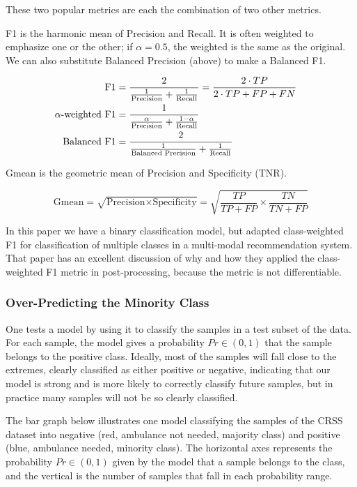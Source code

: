 These two popular metrics are each the combination of two other metrics.  

F1 is the harmonic mean of Precision and Recall.  It is often weighted to emphasize one or the other; if $\alpha = 0.5$, the weighted is the same as the original.  We can also substitute Balanced Precision (above) to make a Balanced F1. 

\begin{align*}
	\text{F1} &= \frac{2}{\frac{1}{\text{Precision}} + \frac{1}{\text{Recall}}} 
	= \frac{2 \cdot TP}{2\cdot TP + FP + FN}\cr
	\text{$\alpha$-weighted F1} &= \frac{1}{\frac{\alpha}{\text{Precision}} + \frac{1 - \alpha}{\text{Recall}}} \cr
	\text{Balanced F1} &= \frac{2}{\frac{1}{\text{Balanced Precision}} + \frac{1}{\text{Recall}}} 
\end{align*}


Gmean is the geometric mean of Precision and Specificity (TNR).

$$
	\text{Gmean} = \sqrt{ \text{Precision} \times \text{Specificity}} 
	= \sqrt{
		\frac{TP}{TP+FP} \times \frac{TN}{TN+FP}
		}
$$

In this paper we have a binary classification model, but
\cite{LIU2021103070} adapted class-weighted F1 for classification of multiple classes in a multi-modal recommendation system.  That paper has an excellent discussion of why and how they applied the class-weighted F1 metric in post-processing, because the metric is not differentiable.  

\subsubsection{Over-Predicting the Minority Class}

One tests a model by using it to classify the samples in a test subset of the data.  For each sample, the model gives a probability $Pr \in (0,1)$ that the sample belongs to the positive class.    Ideally, most of the samples will fall close to the extremes, clearly classified as either positive or negative, indicating that our model is strong and is more likely to correctly classify future samples, but in practice many samples will not be so clearly classified.  

The bar graph below illustrates one model classifying the samples of the CRSS dataset into negative (red, ambulance not needed, majority class) and positive (blue, ambulance needed, minority class).  The horizontal axes represents the probability $Pr \in (0,1)$ given by the model that a sample belongs to the class, and the vertical is the number of samples that fall in each probability range.  

